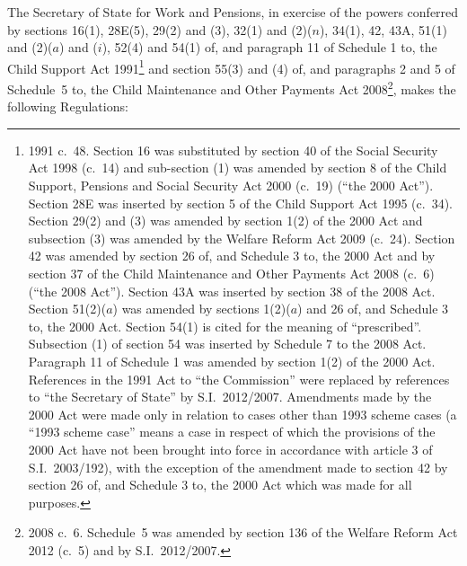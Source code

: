 \documentclass[12pt,a4paper]{article}
\title{\regstitle}
\author{S.I.\ 2014 No.\ 1386}
\date{Made
31st May 2014\\
Laid before Parliament
6th June 2014\\
Coming into force
in accordance with regulation 1
}
\begin{document}
\maketitle

\enlargethispage{\baselineskip}

\noindent
The Secretary of State for Work and Pensions, in exercise of the powers conferred by sections 16(1), 28E(5), 29(2) and (3), 32(1) and (2)($n$), 34(1), 42, 43A, 51(1) and (2)($a$)  and ($i$), 52(4) and 54(1) of, and paragraph 11 of Schedule 1 to, the Child Support Act 1991\footnote{1991 c.~48. Section 16 was substituted by section 40 of the Social Security Act 1998 (c.~14) and sub-section (1) was amended by section 8 of the Child Support, Pensions and Social Security Act 2000 (c.~19) (“the 2000 Act”). Section 28E was inserted by section 5 of the Child Support Act 1995 (c.~34). Section 29(2) and (3) was amended by section 1(2) of the 2000 Act and subsection (3) was amended by the Welfare Reform Act 2009 (c.~24). Section 42 was amended by section 26 of, and Schedule 3 to, the 2000 Act and by section 37 of the Child Maintenance and Other Payments Act 2008 (c.~6) (“the 2008 Act”). Section 43A was inserted by section 38 of the 2008 Act. Section 51(2)($a$)  was amended by sections 1(2)($a$)  and 26 of, and Schedule 3 to, the 2000 Act. Section 54(1) is cited for the meaning of “prescribed”. Subsection (1) of section 54 was inserted by Schedule 7 to the 2008 Act. Paragraph 11 of Schedule 1 was amended by section 1(2) of the 2000 Act. References in the 1991 Act to “the Commission” were replaced by references to “the Secretary of State” by S.I.~2012/2007. Amendments made by the 2000 Act were made only in relation to cases other than 1993 scheme cases (a “1993 scheme case” means a case in respect of which the provisions of the 2000 Act have not been brought into force in accordance with article 3 of S.I.~2003/192), with the exception of the amendment made to section 42 by section 26 of, and Schedule 3 to, the 2000 Act which was made for all purposes.} and section 55(3) and (4) of, and paragraphs 2 and 5 of Schedule~5 to, the Child Maintenance and Other Payments Act 2008\footnote{2008 c.~6. Schedule~5 was amended by section 136 of the Welfare Reform Act 2012 (c.~5) and by S.I.~2012/2007.}, makes the following Regulations: 

{\sloppy

\tableofcontents

}

\bigskip

\setcounter{secnumdepth}{-2}
\end{document}

